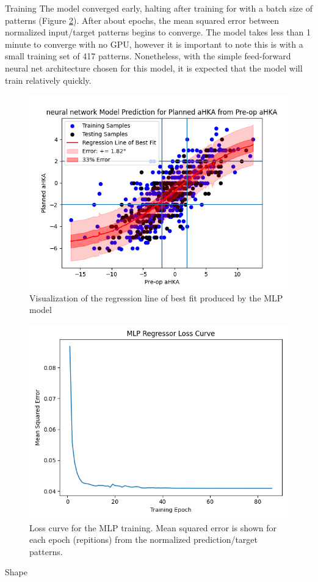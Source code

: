 \documentclass{article}
\begin{document}
Training
	The model converged early, halting after training for \epochs with a batch size of \batchsize patterns (Figure \ref{loss_curve}).
After about \convergence epochs, the mean squared error between normalized input/target patterns begins to converge.
The model takes less than 1 minute to converge with no GPU, however it is important to note this is with a small training set of 417 patterns.
Nonetheless, with the simple feed-forward neural net architecture chosen for this model, it is expected that the model will train relatively quickly. 

\begin{figure}[h!]
	\centering
	\includegraphics[width=.65\linewidth]{neural_network_regression.png}
	\caption{Visualization of the regression line of best fit produced by the MLP model}
	\label{regression}
\end{figure}

\begin{figure}[h!]
	\centering
	\includegraphics[width=.5\linewidth]{loss_curve.png}
	\caption{Loss curve for the MLP training. Mean squared error is shown for each epoch (\batchsize \space repitions) from the normalized prediction/target patterns.}
	\label{loss_curve}
\end{figure}

Shape
\end{document}
